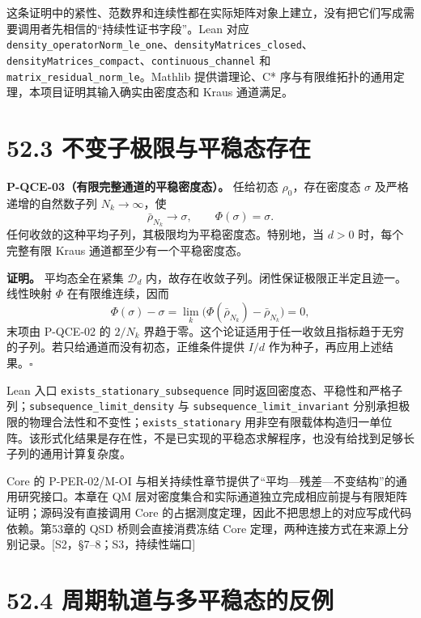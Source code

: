\documentclass[
  11pt,
  oneside]{book}
\begin{document}
这条证明中的紧性、范数界和连续性都在实际矩阵对象上建立，没有把它们写成需要调用者先相信的``持续性证书字段''。Lean
对应
\texttt{density\_\allowbreak operator\allowbreak Norm\_\allowbreak le\_\allowbreak one}、\allowbreak \texttt{density\allowbreak Matrices\_\allowbreak closed}、\allowbreak \texttt{density\allowbreak Matrices\_\allowbreak compact}、\allowbreak \texttt{continuous\_\allowbreak channel}
和 \texttt{matrix\_\allowbreak residual\_\allowbreak norm\_\allowbreak le}。Mathlib 提供谱理论、C*
序与有限维拓扑的通用定理，本项目证明其输入确实由密度态和 Kraus
通道满足。

\section{52.3 不变子极限与平稳态存在}

\protect\hypertarget{p-qce-03}{}{}

\textbf{P-QCE-03（有限完整通道的平稳密度态）。} 任给初态
\(\rho_0\)，存在密度态 \(\sigma\) 及严格递增的自然数子列
\(N_k\to\infty\)，使 \[
\bar\rho_{N_k}\longrightarrow\sigma,\qquad \Phi(\sigma)=\sigma.
\] 任何收敛的这种平均子列，其极限均为平稳密度态。特别地，当 \(d>0\)
时，每个完整有限 Kraus 通道都至少有一个平稳密度态。

\textbf{证明。} 平均态全在紧集 \(\mathcal D_d\)
内，故存在收敛子列。闭性保证极限正半定且迹一。线性映射 \(\Phi\)
在有限维连续，因而 \[
\Phi(\sigma)-\sigma
=\lim_k\bigl(\Phi(\bar\rho_{N_k})-\bar\rho_{N_k}\bigr)=0,
\] 末项由 P-QCE-02 的 \(2/N_k\)
界趋于零。这个论证适用于任一收敛且指标趋于无穷的子列。若只给通道而没有初态，正维条件提供
\(I/d\) 作为种子，再应用上述结果。\(\square\)

Lean 入口 \texttt{exists\_\allowbreak stationary\_\allowbreak subsequence}
同时返回密度态、平稳性和严格子列；\texttt{subsequence\_\allowbreak limit\_\allowbreak density}
与 \texttt{subsequence\_\allowbreak limit\_\allowbreak invariant}
分别承担极限的物理合法性和不变性；\texttt{exists\_\allowbreak stationary}
用非空有限载体构造归一单位阵。该形式化结果是存在性，不是已实现的平稳态求解程序，也没有给找到足够长子列的通用计算复杂度。

Core 的 P-PER-02/M-OI
与相关持续性章节提供了``平均---残差---不变结构''的通用研究接口。本章在
QM
层对密度集合和实际通道独立完成相应前提与有限矩阵证明；源码没有直接调用
Core 的占据测度定理，因此不把思想上的对应写成代码依赖。第53章的 QSD
桥则会直接消费冻结 Core
定理，两种连接方式在来源上分别记录。{[}S2，§7--8；S3，持续性端口{]}

\section{52.4 周期轨道与多平稳态的反例}
\end{document}
